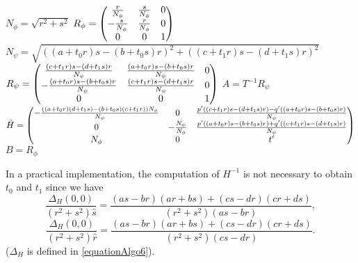    \begin{algorithme}
     \label{pseudoCodeDecompo}
     \caption{$decomposition(H)$}
     $N_\phi = \sqrt{r^2+s^2}$\;
     $R_\phi = \begin{pmatrix} 
      \frac{r}{N_\phi} & \frac{s}{N_\phi} & 0\\
      -\frac{s}{N_\phi} & \frac{r}{N_\phi} & 0\\
      0 & 0 & 1 \end{pmatrix}$\;
     $N_\psi = \sqrt{((a+t_0r)s-(b+t_0s)r)^2+((c+t_1r)s-(d+t_1s)r)^2}$\;
     $R_\psi = \begin{pmatrix} 
      \frac{(c+t_1r)s-(d+t_1s)r}{N_\psi} & \frac{(a+t_0r)s-(b+t_0s)r}{N_\psi} & 0\\
      -\frac{(a+t_0r)s-(b+t_0s)r}{N_\psi} & \frac{(c+t_1r)s-(d+t_1s)r}{N_\psi} & 0\\
      0 & 0 & 1 \end{pmatrix}$\;
     $A = T^{-1}R_\psi$\;
     $\tilde H = \begin{pmatrix} 
      -\frac{((a+t_0r)(d+t_1s)-(b+t_0s)(c+t_1r))N_\phi}{N_\psi} & 0 & \frac{p'((c+t_1r)s-(d+t_1s)r)-q'((a+t_0r)s-(b+t_0s)r)}{N_\psi}\\
      0 & -\frac{N_\psi}{N_\phi} & \frac{p'((a+t_0r)s-(b+t_0s)r)+q'((c+t_1r)s-(d+t_1s)r)}{N_\psi}\\
      N_\phi & 0 & t' \end{pmatrix}$\;
     $B = R_\phi$\;
   \end{algorithme}
   
   In a practical implementation, the computation of $H^{-1}$ is not necessary to obtain $t_0$ and $t_1$ since we have
   \[\frac{\Delta_H(0,0)}{(r^2+s^2)\hat s} = \frac{(as-br)(ar+bs)+(cs-dr)(cr+ds)}{(r^2+s^2)(as-br)},\]
 \[\frac{\Delta_H(0,0)}{(r^2+s^2)\hat r} = \frac{(as-br)(ar+bs)+(cs-dr)(cr+ds)}{(r^2+s^2)(cs-dr)}.\]
 ($\Delta_H$ is defined in \eqref{equationAlgo6}).
   

